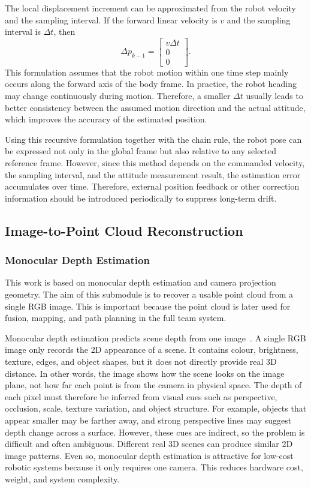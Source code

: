 \documentclass[12pt]{interim_report}
\begin{document}
The local displacement increment can be approximated from the robot velocity and the sampling interval. If the forward linear velocity is \(v\) and the sampling interval is \(\Delta t\), then
\[
\Delta p_{k-1}=
\begin{bmatrix}
v\Delta t \\
0 \\
0
\end{bmatrix}.
\]
This formulation assumes that the robot motion within one time step mainly occurs along the forward axis of the body frame. In practice, the robot heading may change continuously during motion. Therefore, a smaller \(\Delta t\) usually leads to better consistency between the assumed motion direction and the actual attitude, which improves the accuracy of the estimated position.

Using this recursive formulation together with the chain rule, the robot pose can be expressed not only in the global frame but also relative to any selected reference frame. However, since this method depends on the commanded velocity, the sampling interval, and the attitude measurement result, the estimation error accumulates over time. Therefore, external position feedback or other correction information should be introduced periodically to suppress long-term drift.

\subsection{Image-to-Point Cloud Reconstruction}
\label{subsec:image-to-point-cloud-junjie-ouyang}

\subsubsection{Monocular Depth Estimation}
\label{subsubsec:monocular-depth-estimation-junjie-ouyang}

This work is based on monocular depth estimation and camera projection geometry. The aim of this submodule is to recover a usable point cloud from a single RGB image. This is important because the point cloud is later used for fusion, mapping, and path planning in the full team system.

Monocular depth estimation predicts scene depth from one image~\cite{godard2019}. A single RGB image only records the 2D appearance of a scene. It contains colour, brightness, texture, edges, and object shapes, but it does not directly provide real 3D distance. In other words, the image shows how the scene looks on the image plane, not how far each point is from the camera in physical space. The depth of each pixel must therefore be inferred from visual cues such as perspective, occlusion, scale, texture variation, and object structure. For example, objects that appear smaller may be farther away, and strong perspective lines may suggest depth change across a surface. However, these cues are indirect, so the problem is difficult and often ambiguous. Different real 3D scenes can produce similar 2D image patterns. Even so, monocular depth estimation is attractive for low-cost robotic systems because it only requires one camera. This reduces hardware cost, weight, and system complexity.
\end{document}
